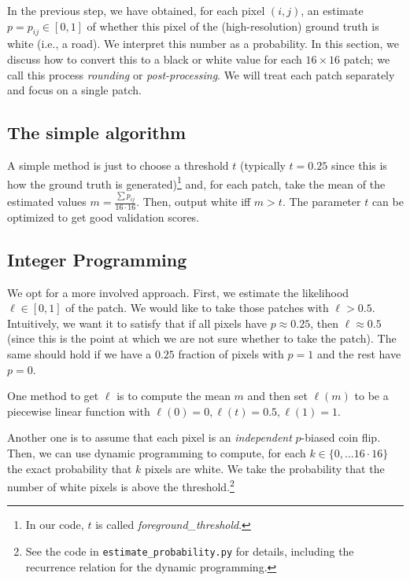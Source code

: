 
In the previous step, we have obtained, for each pixel $(i,j)$, an estimate $p = p_{ij} \in [0,1]$ of whether this pixel of the (high-resolution) ground truth is white (i.e., a road). We interpret this number as a probability. In this section, we discuss how to convert this to a black or white value for each $16 \times 16$ patch; we call this process \emph{rounding} or \emph{post-processing}. We will treat each patch separately and focus on a single patch.

\subsection{The simple algorithm}

A simple method is just to choose a threshold $t$ (typically $t = 0.25$ since this is how the ground truth is generated)\footnote{In our code, $t$ is called \textit{foreground_threshold}.} and, for each patch, take the mean of the estimated values $m = \frac{\sum p_{ij}}{16 \cdot 16}$. Then, output white iff $m > t$. The parameter $t$ can be optimized to get good validation scores.


\subsection{Integer Programming}

We opt for a more involved approach. First, we estimate the likelihood $\ell \in [0,1]$ of the patch. We would like to take those patches with $\ell > 0.5$. Intuitively, we want it to satisfy that if all pixels have $p \approx 0.25$, then $\ell \approx 0.5$ (since this is the point at which we are not sure whether to take the patch). The same should hold if we have a $0.25$ fraction of pixels with $p = 1$ and the rest have $p = 0$.

One method to get $\ell$ is to compute the mean $m$ and then set $\ell(m)$ to be a piecewise linear function with $\ell(0) = 0, \ell(t) = 0.5, \ell(1) = 1$.

Another one is to assume that each pixel is an \emph{independent} $p$-biased coin flip. Then, we can use dynamic programming to compute, for each $k \in \{0, ... 16 \cdot 16\}$ the exact probability that $k$ pixels are white. We take the probability that the number of white pixels is above the threshold.\footnote{See the code in \texttt{estimate_probability.py} for details, including the recurrence relation for the dynamic programming.}

